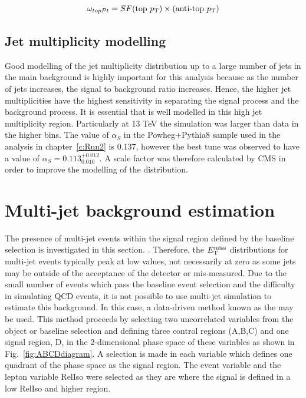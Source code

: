 \begin{equation}
\omega_{topPt} = SF(\textrm{top}~p_{\mathrm{T}})\times (\textrm{anti-top}~p_{\mathrm{T}})
\label{eqn:topptW}
\end{equation}

\subsection{Jet multiplicity modelling \label{subsec:alphaS}}
Good modelling of the jet multiplicity distribution up to a large number of jets in the main \ttbar background is highly important for this analysis because as the number of jets increases, the signal to background ratio increases. Hence, the higher jet multiplicities have the highest sensitivity in separating the signal \tttt process and the background \ttbar process. It is essential that \ttbar is well modelled in this high jet multiplicity region. 
Particularly at 13 TeV the simulation was larger than data in the higher \njets bins. The value of $\alpha_S$ in the \ttbar Powheg+Pythia8 sample used in the analysis in chapter~\ref{c:Run2} is 0.137, however the best tune was observed to have a value of $\alpha_S=0.113^{+0.012}_{0.010}$. A scale factor was therefore calculated by CMS in order to improve the modelling of the \njets distribution. 

\section{Multi-jet background estimation}
\label{sec:QCDbackground}
The presence of multi-jet events within the signal region defined by the baseline selection is investigated in this section. . Therefore, the $E_{\mathrm{T}}^{\text{miss}}$ distributions for multi-jet events typically peak at low values, not necessarily at zero as some jets may be outside of the acceptance of the detector or mis-measured. Due to the small number of events which pass the baseline event selection and the difficulty in simulating QCD events, it is not possible to use multi-jet simulation to estimate this background. In this case, a data-driven method known as the  may be used. This method proceeds by selecting two uncorrelated variables from the object or baseline selection and defining three control regions (A,B,C) and one signal region, D, in the 2-dimensional phase space of these variables as shown in Fig.~\ref{fig:ABCDdiagram}. A selection is made in each variable which defines one quadrant of the phase space as the signal region.  The event variable \MET and the lepton variable RelIso were selected as they are  where the signal is defined in a low RelIso and higher \MET region.\\

